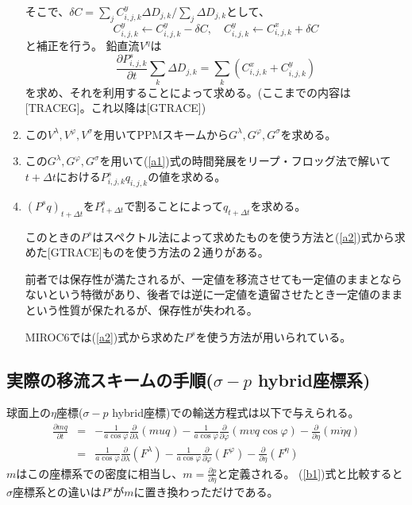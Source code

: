 \documentclass{jsbook}
\begin{document}
\begin{enumerate}
  そこで、$\delta C=\sum_{j}C^{y}_{i,j,k}\Delta D_{j,k}/\sum_{j}\Delta D_{j,k}$として、
  \begin{equation}
    C^{y}_{i,j,k}\leftarrow C^{y}_{i,j,k}-\delta C, \quad C^{y}_{i,j,k}\leftarrow C^{x}_{i,j,k}+\delta C
  \end{equation}
  と補正を行う。
  鉛直流$V^{\eta}$は
  \begin{equation}
    \label{a2}
    \frac{\partial P^{s}_{i,j,k}}{\partial t}\sum_{k}\Delta D_{j,k}=\sum_{k}(C^{x}_{i,j,k}+C^{y}_{i,j,k})
  \end{equation}
  を求め、それを利用することによって求める。(ここまでの内容は[TRACEG]。これ以降は[GTRACE])
\item この$V^{\lambda}, V^{\varphi}, V^{\sigma}$を用いてPPMスキームから$G^{\lambda}, G^{\varphi}, G^{\sigma}$を求める。
\item この$G^{\lambda}, G^{\varphi}, G^{\sigma}$を用いて(\ref{a1})式の時間発展をリープ・フロッグ法で解いて$t+\Delta t$における$P^{s}_{i,j,k}q_{i,j,k}$の値を求める。
\item $(P^{s}q)_{t+\Delta t}$を$P^{s}_{t+\Delta t}$で割ることによって$q_{t+\Delta t}$を求める。

  このときの$P^{s}$はスペクトル法によって求めたものを使う方法と(\ref{a2})式から求めた[GTRACE]ものを使う方法の２通りがある。

  前者では保存性が満たされるが、一定値を移流させても一定値のままとならないという特徴があり、後者では逆に一定値を遺留させたとき一定値のままという性質が保たれるが、保存性が失われる。

  MIROC6では(\ref{a2})式から求めた$P^{s}$を使う方法が用いられている。
\end{enumerate}
\subsection{実際の移流スキームの手順($\sigma-p$ hybrid座標系)}
球面上の$\eta$座標($\sigma-p$ hybrid座標)での輸送方程式は以下で与えられる。
\begin{eqnarray}                                                             \frac{\partial mq}{\partial t} &=& - \frac{1}{a \cos \varphi} \frac{\partial}{\partial \lambda}(muq)- \frac{1}{a \cos \varphi} \frac{\partial}{\partial \varphi}(mvq \cos \varphi)- \frac{\partial}{\partial \eta} (m \dot{\eta} q)\\                                                                         &=& \frac{1}{a \cos \varphi} \frac{\partial}{\partial \lambda}(F^{\lambda})- \frac{1}{a \cos \varphi} \frac{\partial}{\partial \varphi}(F^{\varphi})-\frac{\partial}{\partial \eta} (F^{\eta})                                    
\end{eqnarray}                                                               
$m$はこの座標系での密度に相当し、$m=\frac{\partial p}{\partial \eta}$と定義される。
(\ref{b1})式と比較すると$\sigma$座標系との違いは$P^{s}$が$m$に置き換わっただけである。
\end{document}
